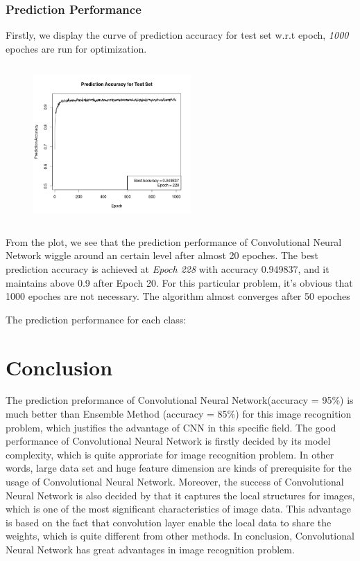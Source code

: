 \documentclass[paper=a4, fontsize=11pt]{scrartcl}
\begin{document}
\newpage
\subsubsection*{Prediction Performance}
Firstly, we display the curve of prediction accuracy for test set w.r.t epoch, \textit{1000} epoches are run for optimization.
\begin{figure}[ht]
\centering
\includegraphics[width=6cm,height=6cm,angle=0]{Rplot.png}
\end{figure}
From the plot, we see that the prediction performance of Convolutional Neural Network wiggle around an certain level after almost 20 epoches. The best prediction accuracy is achieved at \textit{Epoch 228} with accuracy 0.949837, and it maintains above 0.9 after {Epoch 20}. For this particular problem, it's obvious that 1000 epoches are not necessary. The algorithm almost converges after 50 epoches

The prediction performance for each class:


\section*{Conclusion}
The prediction preformance of Convolutional Neural Network(accuracy = 95\%) is much better than Ensemble Method (accuracy = 85\%) for this image recognition problem, which justifies the advantage of CNN in this specific field. The good performance of Convolutional Neural Network is firstly decided by its model complexity, which is quite approriate for image recognition problem. In other words, large data set and huge feature dimension are kinds of prerequisite for the usage of Convolutional Neural Network. Moreover, the success of Convolutional Neural Network is also decided by that it captures the local structures for images, which is one of the most significant characteristics of image data. This advantage is based on the fact that convolution layer enable the local data to share the weights, which is quite different from other methods. In conclusion, Convolutional Neural Network has great advantages in image recognition problem.
\end{document}
